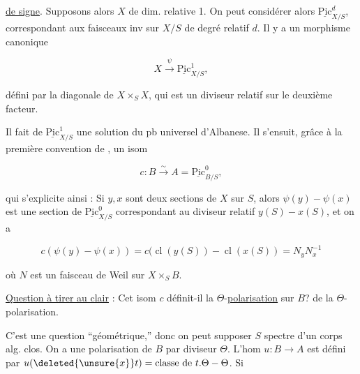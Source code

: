 
\uline{de signe}. Supposons alors $X$  de dim. relative 1. On peut considérer alors $\underline{\mathrm{Pic}}^d_{X/S}$,  correspondant aux faisceaux inv sur $X/S$ de degré relatif $d$. Il y a un morphisme canonique

\[
X\xrightarrow{\psi}\underline{\mathrm{Pic}}^1_{X/S},
\]

 défini par la diagonale de $X\times_S X$, qui est un diviseur relatif sur le deuxième facteur.


Il fait de $\underline{\mathrm{Pic}}^1_{X/S}$ une solution du pb universel d'Albanese. Il s'ensuit, grâce à la première convention de , un isom

\[
c\colon B\xrightarrow{\sim} A=\underline{\mathrm{Pic}}^0_{B/S},
\]

qui s'explicite ainsi : Si $y,x$ sont deux sections de $X$ sur $S$, alors $\psi(y)-\psi(x)$ est une section de $\underline{\mathrm{Pic}}^0_{X/S}$ correspondant au diviseur relatif $y(S)-x(S)$, et on a

\[
c(\psi(y)-\psi(x))=c(\operatorname{cl}(y(S))-\operatorname{cl}(x(S))=N_yN_x^{-1}
\]

où $N$ est un faisceau de Weil sur $X\times_S B$.

\uline{Question à tirer au clair} : Cet isom $c$ définit-il  la $\Theta$-\uline{polarisation} sur $B$?   de la $\Theta$-polarisation.

C'est une question ``géométrique,'' donc on peut supposer $S$ spectre d'un corps alg. clos. On a une polarisation de $B$ par   diviseur $\Theta$. L'hom  $u\colon B\longrightarrow A$ est défini par $u(\deleted{\unsure{x}}t)=\text{classe de }t.\Theta-\Theta$. Si
